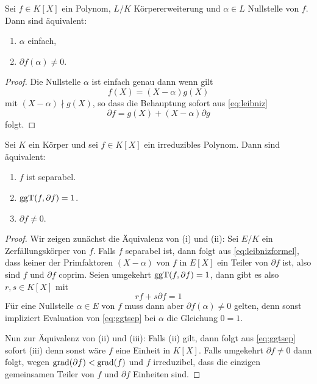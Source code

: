 \documentclass{book}
\begin{document}
\begin{lem}
    \label{lem:kritsimp}
    Sei $f \in K[X]$ ein Polynom, $L/K$ Körpererweiterung und $\alpha \in L$
    Nullstelle von $f$. Dann sind äquivalent:
    \begin{enumerate}[label=(\roman{*})]
        \item $\alpha$ einfach,
        \item $\partial f (\alpha) \neq 0$.
    \end{enumerate}
\end{lem}
\begin{proof}
    Die Nullstelle $\alpha$ ist einfach genau dann wenn gilt
    \[
        f(X) = (X-\alpha)g(X)
    \]
    mit $(X-\alpha) \nmid g(X)$, so dass die Behauptung sofort aus \eqref{eq:leibniz}
    \begin{equation}
        \label{eq:leibnizformel}
            \partial f = g(X) + (X-\alpha) \partial g
    \end{equation}
    folgt. 
\end{proof}

\begin{prop} \label{prop:irredsep} Sei $K$ ein Körper und sei $f \in K[X]$ ein
    irreduzibles Polynom. Dann sind äquivalent:
    \begin{enumerate}[label=(\roman *)]
        \item $f$ ist separabel.
        \item $\operatorname{ggT}(f, \partial f) = 1$.
        \item $\partial f \neq 0$.
    \end{enumerate}
\end{prop}
\begin{proof}
    Wir zeigen zunächst die Äquivalenz von (i) und (ii): 
    Sei $E/K$ ein Zerfällungskörper von $f$. Falls $f$ separabel ist, dann
    folgt aus \eqref{eq:leibnizformel}, dass keiner der Primfaktoren
    $(X-\alpha)$ von $f$ in $E[X]$ ein Teiler von $\partial f$ ist, also sind
    $f$ und $\partial f$ coprim.
    Seien umgekehrt $\operatorname{ggT}(f, \partial f) = 1$, dann gibt es also $r,s \in K[X]$ mit
    \begin{equation}
        \label{eq:ggtsep}
        rf + s\partial f = 1
    \end{equation}
    Für eine Nullstelle $\alpha \in E$ von $f$ muss dann aber $\partial f (\alpha) \neq 0$
    gelten, denn sonst impliziert Evaluation von \eqref{eq:ggtsep} bei $\alpha$
    die Gleichung $0 = 1$. 

    Nun zur Äquivalenz von (ii) und (iii): Falls (ii) gilt, dann folgt aus
    \eqref{eq:ggtsep} sofort (iii) denn sonst wäre $f$ eine Einheit in $K[X]$.
    Falls umgekehrt $\partial f \neq 0$ dann folgt, wegen $\operatorname{grad}(\partial f)
    < \operatorname{grad}(f)$ und $f$ irreduzibel, dass die einzigen gemeinsamen Teiler von
    $f$ und $\partial f$ Einheiten sind. 
\end{proof}
\end{document}
